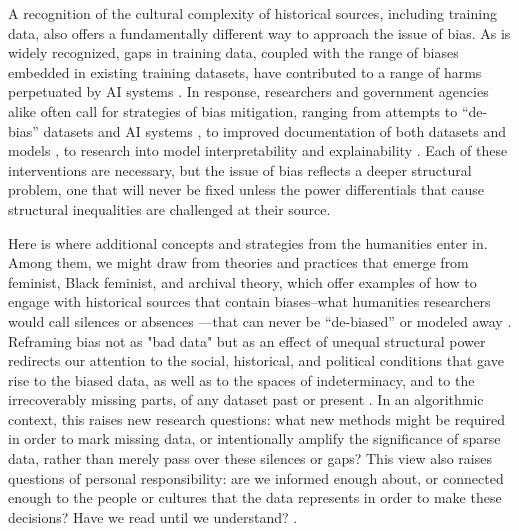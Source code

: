 A recognition of the cultural complexity of historical sources, including training data, also offers a fundamentally different way to approach the issue of bias. As is widely recognized, gaps in training data, coupled with the range of biases embedded in existing training datasets, have contributed to a range of harms perpetuated by AI systems \citep{Buolamwini_Gebru_2018, Noble_2018, Eubanks_2018}. In response, researchers and government agencies alike often call for strategies of bias mitigation, ranging from attempts to ``de-bias'' datasets and AI systems \citep{Bolukbasi_Chang_Zou_Saligrama_Kalai_2016}, to improved documentation of both datasets \cite{ Gebru_Morgenstern_Vecchione_Vaughan_Wallach_III_Crawford_2021} and models \cite{Mitchell_Wu_Zaldivar_Barnes_Vasserman_Hutchinson_Spitzer_Raji_Gebru_2019}, to research into model interpretability \cite{Bhatt_Ravikumar_Moura_2019} and explainability \cite{Danilevsky_Qian_Aharonov_Katsis_Kawas_Sen_2020}. Each of these interventions are necessary, but the issue of bias reflects a deeper structural problem, one that will never be fixed unless the power differentials that cause structural inequalities are challenged at their source. 

Here is where additional concepts and strategies from the humanities enter in. Among them, we might draw from theories and practices that emerge from feminist, Black feminist, and archival theory, which offer examples of how to engage with historical sources that contain biases–what humanities researchers would call silences \cite{trouillot_silencing_2015} or absences \cite{Hartman_2008}---that can never be ``de-biased'' or modeled away \cite{bode_why_2020}. Reframing bias not as "bad data" but as an effect of unequal structural power redirects our attention to the social, historical, and political conditions that gave rise to the biased data, as well as to the spaces of indeterminacy, and to the irrecoverably missing parts, of any dataset past or present \cite{Sherman_Morrison_Klein_Rosner_2024}. In an algorithmic context, this raises new research questions: what new methods might be required in order to mark missing data, or intentionally amplify the significance of sparse data, rather than merely pass over these silences or gaps? This view also raises questions of personal responsibility: are we informed enough about, or connected enough to the people or cultures that the data represents in order to make these decisions? Have we read until we understand? \cite{Griffin_2021}. 

